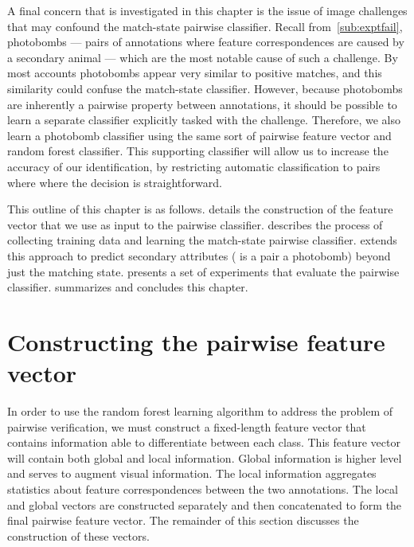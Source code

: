 A final concern that is investigated in this chapter is the issue of image challenges that may confound the
  match-state pairwise classifier.
Recall from~\cref{sub:exptfail}, {photobombs} --- pairs of annotations where feature correspondences
  are caused by a secondary animal --- which are the most notable cause of such a challenge.
By most accounts photobombs appear very similar to positive matches, and this similarity could confuse the
  match-state classifier.
However, because photobombs are inherently a pairwise property between annotations, it should be possible to
  learn a separate classifier explicitly tasked with the challenge.
Therefore, we also learn a photobomb classifier using the same sort of pairwise feature vector and random forest
  classifier.
This supporting classifier will allow us to increase the accuracy of our identification, by restricting automatic
  classification to pairs where where the decision is straightforward.


This outline of this chapter is as follows.
 details the construction of the feature vector that we use as input to the pairwise
  classifier.
 describes the process of collecting training data and learning the match-state pairwise
  classifier.
 extends this approach to predict secondary attributes (\eg{} is a pair a photobomb) beyond
  just the matching state.
 presents a set of experiments that evaluate the pairwise classifier.
 summarizes and concludes this chapter.


\section{Constructing the pairwise feature vector}\label{sec:pairfeat}

In order to use the random forest learning algorithm to address the problem of pairwise verification, we must
  construct a fixed-length feature vector that contains information able to differentiate between each class.
This feature vector will contain both global and local information.
Global information is higher level and serves to augment visual information.
The local information aggregates statistics about feature correspondences between the two annotations.
The local and global vectors are constructed separately and then concatenated to form the final pairwise feature
  vector.
The remainder of this section discusses the construction of these vectors.

